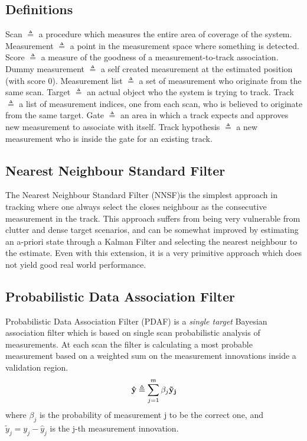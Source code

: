 \subsection{Definitions}
Scan $\triangleq$ a procedure which measures the entire area of coverage of the system. \newline
Measurement $\triangleq$ a point in the measurement space where something is detected.\newline
Score $\triangleq$ a measure of the goodness of a measurement-to-track association. \newline
Dummy measurement $\triangleq$ a self created measurement at the estimated position (with score 0).\newline
Measurement list $\triangleq$ a set of measurement who originate from the same scan. \newline
Target $\triangleq$ an actual object who the system is trying to track. \newline
Track $\triangleq$ a list of measurement indices, one from each scan, who is believed to originate from the same target. \newline
Gate $\triangleq$ an area in which a track expects and approves new measurement to associate with itself. \newline
Track hypothesis $\triangleq$ a new measurement who is inside the gate for an existing track.


\subsection{Nearest Neighbour Standard Filter}
The Nearest Neighbour Standard Filter (NNSF)is the simplest approach in tracking where one always select the closes neighbour as the consecutive measurement in the track. This approach suffers from being very vulnerable from clutter and dense target scenarios, and can be somewhat improved by estimating an a-priori state through a Kalman Filter and selecting the nearest neighbour to the estimate. Even with this extension, it is a very primitive approach which does not yield good real world performance. %

\subsection{Probabilistic Data Association Filter}
Probabilistic Data Association Filter (PDAF) is a \emph{single target} Bayesian association filter which is based on single scan probabilistic analysis of measurements. At each scan the filter is calculating a most probable measurement based on a weighted sum on the measurement innovations inside a validation region.
\begin{equation}
\boldsymbol{\mathbf{\hat{y}}} \triangleq \sum\limits_{j=1}^m \beta_j \boldsymbol{\mathbf{ \tilde{y}_j }}
\label{PDA_sum}
\end{equation}
where $\beta_j$ is the probability of measurement j to be the correct one, and $ \tilde{y}_j = y_j - \hat{y}_j $ is the j-th measurement innovation. 

